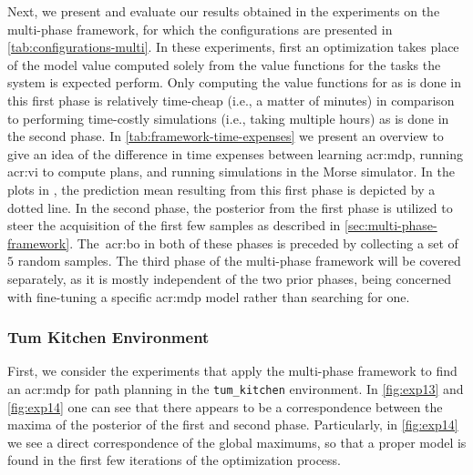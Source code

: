 Next, we present and evaluate our results obtained in the experiments on the multi-phase framework, for which the configurations are presented in \autoref{tab:configurations-multi}.
In these experiments, first an optimization takes place of the model value computed solely from the value functions for the tasks the system is expected perform.
Only computing the value functions for  as is done in this first phase is relatively time-cheap (i.e., a matter of minutes) in comparison to performing time-costly simulations (i.e., taking multiple hours) as is done in the second phase.
In \autoref{tab:framework-time-expenses} we present an overview to give an idea of the difference in time expenses between learning \acrshort{acr:mdp}, running \acrshort{acr:vi} to compute plans, and running simulations in the Morse simulator.
In the plots in , the prediction mean resulting from this first phase is depicted by a dotted line.
In the second phase, the posterior from the first phase is utilized to steer the acquisition of the first few samples as described in \autoref{sec:multi-phase-framework}.
The~\acrshort{acr:bo} in both of these phases is preceded by collecting a set of $5$ random samples.
The third phase of the multi-phase framework will be covered separately, as it is mostly independent of the two prior phases, being concerned with fine-tuning a specific \acrshort{acr:mdp} model rather than searching for one.


\subsubsection{Tum Kitchen Environment}
First, we consider the experiments that apply the multi-phase framework to find an \acrshort{acr:mdp} for path planning in the \texttt{tum\_kitchen} environment.
In \autoref{fig:exp13} and \autoref{fig:exp14} one can see that there appears to be a correspondence between the maxima of the posterior of the first and second phase.
Particularly, in \autoref{fig:exp14} we see a direct correspondence of the global maximums, so that a proper model is found in the first few iterations of the optimization process.

